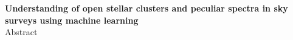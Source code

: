 \cleardoublepage
\begin{center}
{\bf Understanding of open stellar clusters and peculiar spectra in sky surveys using machine learning}\\[3mm]
{\sc  Abstract}
\end{center}
\vspace{10mm}



\cleardoublepage
\tableofcontents








